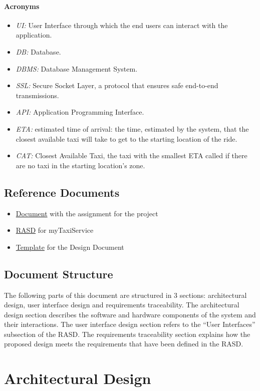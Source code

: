 \documentclass{article}
\begin{document}
	\paragraph{Acronyms}
	\begin{itemize}
		\item \textit{UI:} User Interface through which the end users can interact with the application.
		\item \textit{DB:} Database.
		\item \textit{DBMS:} Database Management System.
		\item \textit{SSL:} Secure Socket Layer, a protocol that ensures safe end-to-end transmissions.
		\item \textit{API:} Application Programming Interface.
		\item \textit{ETA:} estimated time of arrival: the time, estimated by the system, that the closest available taxi will take to get to the starting location of the ride.
		\item \textit{CAT:} Closest Available Taxi, the taxi with the smallest ETA called if there are no taxi in the starting location's zone.
	\end{itemize}
	\subsection{Reference Documents}
	\begin{itemize}
		\item \href{run:./external_references/assignments.pdf}{Document} with the assignment for the project
		\item \href{run:./external_references/Rasd.pdf}{RASD} for myTaxiService
		\item \href{run:./external_references/DDTOC.pdf}{Template} for the Design Document
	\end{itemize}
	\subsection{Document Structure}
	The following parts of this document are structured in 3 sections: architectural design, user interface design and requirements traceability. The architectural design section describes the software and hardware components of the system and their interactions. The user interface design section refers to the ``User Interfaces'' subsection of the RASD\@. The requirements traceability section explains how the proposed design meets the requirements that have been defined in the RASD\@.
	\clearpage
	\section{Architectural Design}
\end{document}
